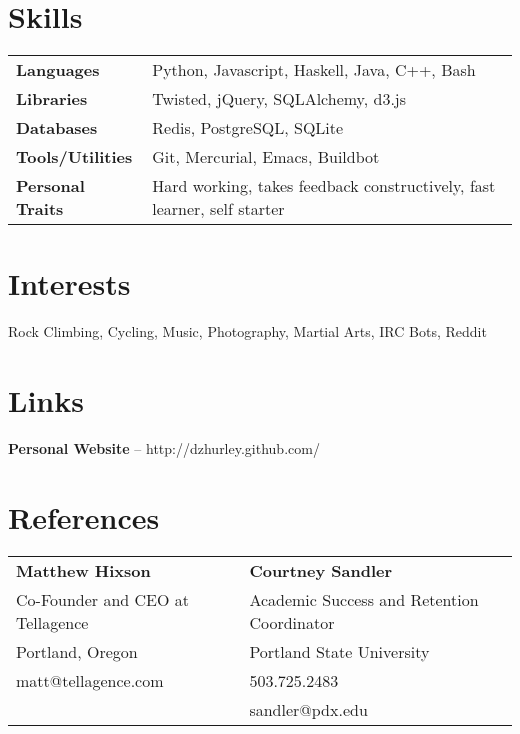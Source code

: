 \documentclass[margin,line]{resume}
\begin{document}
\begin{resume}
    \section{\mysidestyle Skills}

    \vspace{1mm}
    \begin{tabular}{@{}l|l}
        \textbf{Languages}       & Python, Javascript, Haskell, Java, C++, Bash\\[1mm]
        \textbf{Libraries}       & Twisted, jQuery, SQLAlchemy, d3.js\\[1mm]
        \textbf{Databases}       & Redis, PostgreSQL, SQLite\\[1mm]
        \textbf{Tools/Utilities} & Git, Mercurial, Emacs, Buildbot\\[1mm]
        \textbf{Personal Traits} & Hard working, takes feedback constructively, fast learner, self starter
    \end{tabular}

    \section{\mysidestyle Interests}

    Rock Climbing, Cycling, Music, Photography, Martial Arts, IRC Bots, Reddit

    \section{\mysidestyle Links}

    \textbf{Personal Website} -- http://dzhurley.github.com/

    \section{\mysidestyle References}

    \vspace{1mm}
    \begin{tabular}{@{}ll}
        \textbf{Matthew Hixson}           &  \textbf{Courtney Sandler}                   \\
        Co-Founder and CEO at Tellagence  &  Academic Success and Retention Coordinator  \\
        Portland, Oregon                  &  Portland State University                   \\
        matt@tellagence.com               &  503.725.2483                                \\
                                          &  sandler@pdx.edu                             \\
    \end{tabular}

\end{resume}
\end{document}
